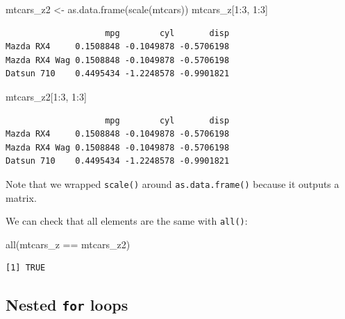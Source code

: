\documentclass[
]{book}
\newenvironment{Shaded}{\begin{snugshade}}{\end{snugshade}}
\newcommand{\DecValTok}[1]{\textcolor[rgb]{0.00,0.00,0.81}{#1}}
\newcommand{\FunctionTok}[1]{\textcolor[rgb]{0.00,0.00,0.00}{#1}}
\newcommand{\NormalTok}[1]{#1}
\newcommand{\OtherTok}[1]{\textcolor[rgb]{0.56,0.35,0.01}{#1}}
\newcommand{\SpecialCharTok}[1]{\textcolor[rgb]{0.00,0.00,0.00}{#1}}
\begin{document}
\begin{Shaded}
\begin{Highlighting}[]
\NormalTok{mtcars\_z2 }\OtherTok{\textless{}{-}} \FunctionTok{as.data.frame}\NormalTok{(}\FunctionTok{scale}\NormalTok{(mtcars))}
\NormalTok{mtcars\_z[}\DecValTok{1}\SpecialCharTok{:}\DecValTok{3}\NormalTok{, }\DecValTok{1}\SpecialCharTok{:}\DecValTok{3}\NormalTok{]}
\end{Highlighting}
\end{Shaded}

\begin{verbatim}
                    mpg        cyl       disp
Mazda RX4     0.1508848 -0.1049878 -0.5706198
Mazda RX4 Wag 0.1508848 -0.1049878 -0.5706198
Datsun 710    0.4495434 -1.2248578 -0.9901821
\end{verbatim}

\begin{Shaded}
\begin{Highlighting}[]
\NormalTok{mtcars\_z2[}\DecValTok{1}\SpecialCharTok{:}\DecValTok{3}\NormalTok{, }\DecValTok{1}\SpecialCharTok{:}\DecValTok{3}\NormalTok{]}
\end{Highlighting}
\end{Shaded}

\begin{verbatim}
                    mpg        cyl       disp
Mazda RX4     0.1508848 -0.1049878 -0.5706198
Mazda RX4 Wag 0.1508848 -0.1049878 -0.5706198
Datsun 710    0.4495434 -1.2248578 -0.9901821
\end{verbatim}

Note that we wrapped \texttt{scale()} around \texttt{as.data.frame()} because it outputs a matrix.

We can check that all elements are the same with \texttt{all()}:

\begin{Shaded}
\begin{Highlighting}[]
\FunctionTok{all}\NormalTok{(mtcars\_z }\SpecialCharTok{==}\NormalTok{ mtcars\_z2)}
\end{Highlighting}
\end{Shaded}

\begin{verbatim}
[1] TRUE
\end{verbatim}

\hypertarget{nested-for-loops}{%
\subsection{\texorpdfstring{Nested \texttt{for} loops}{Nested for loops}}\label{nested-for-loops}}
\end{document}
